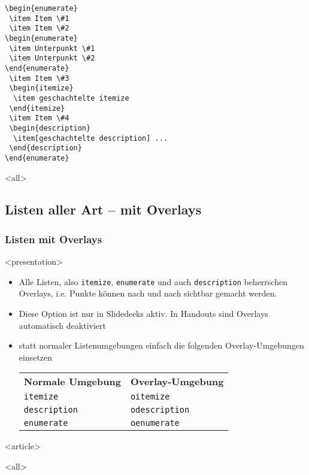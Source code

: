 \begin{frame}[fragile]
\begin{lstlisting}
\begin{enumerate}
 \item Item \#1
 \item Item \#2
\begin{enumerate}
 \item Unterpunkt \#1
 \item Unterpunkt \#2
\end{enumerate}
 \item Item \#3
 \begin{itemize}
  \item geschachtelte itemize
 \end{itemize}
 \item Item \#4
 \begin{description}
  \item[geschachtelte description] ...
 \end{description}
\end{enumerate}
\end{lstlisting}

\mode
<all>

\end{frame}
\newpage

\subsection{Listen aller Art -- mit Overlays}
\begin{frame}[fragile]
\frametitle<presentation>{Listen mit Overlays}


\mode
<presentation>
\begin{itemize}
 \item Alle Listen, also \texttt{itemize}, \texttt{enumerate} und auch \texttt{description} beherrschen Overlays, i.e. Punkte können nach und nach sichtbar gemacht werden.
\item Diese Option ist nur in Slidedecks aktiv. In Handouts sind Overlays automatisch deaktiviert
 \item statt normaler Listenumgebungen einfach die folgenden Overlay-Umgebungen einsetzen
\small
\begin{block}{}
\begin{center}
\begin{tabularx}{\textwidth}{lX}
\textbf{Normale Umgebung} & \textbf{Overlay-Umgebung} \\
\texttt{itemize} & \texttt{oitemize} \\
\texttt{description} & \texttt{odescription} \\
\texttt{enumerate} & \texttt{oenumerate} \\
\end{tabularx}
\end{center}
\end{block}
\normalsize
\end{itemize}

\mode
<article>

\mode
<all>
\end{frame}
\newpage

